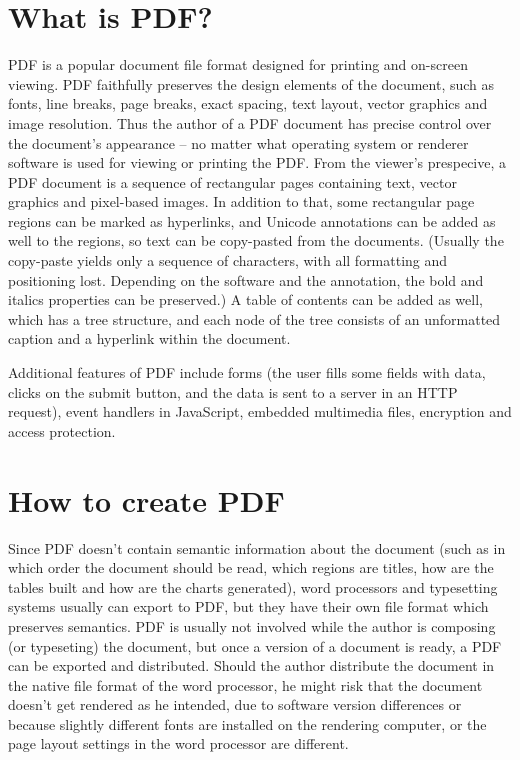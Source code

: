 \documentclass{article}
\begin{document}
\section{What is PDF?}

PDF is a popular document file format designed for printing and on-screen
viewing. PDF faithfully preserves the design elements of the document, such
as fonts, line breaks, page breaks, exact spacing, text layout, vector
graphics and image resolution. Thus the author of a PDF document has precise
control over the document's appearance -- no matter what operating system or
renderer software is used for viewing or printing the PDF. From the viewer's
prespecive, a PDF document is a sequence of rectangular pages containing
text, vector graphics and pixel-based images. In addition to that, some
rectangular page regions can be marked as hyperlinks, and Unicode
annotations can be added as well to the regions, so text can be copy-pasted
from the documents. (Usually the copy-paste yields only a sequence of
characters, with all formatting and positioning lost. Depending on the
software and the annotation, the bold and italics properties can be
preserved.) A table of contents can be added as well, which has a tree
structure, and each node of the tree consists of an unformatted caption and
a hyperlink within the document.

Additional features of PDF include forms (the user fills some fields with
data, clicks on the submit button, and the data is sent to a server in an
HTTP request), event handlers in JavaScript, embedded multimedia files,
encryption and access protection.

\section{How to create PDF}

Since PDF doesn't contain semantic information about the document (such as
in which order the document should be read, which regions are titles, how
are the tables built and how are the charts generated), word processors and
typesetting systems usually can export to PDF, but they have their own file
format which preserves semantics. PDF is usually not involved while the
author is composing (or typeseting) the document, but once a version of a
document is ready, a PDF can be exported and distributed. Should the author
distribute the document in the native file format of the word processor, he
might risk that the document doesn't get rendered as he intended, due to
software version differences or because slightly different fonts are
installed on the rendering computer, or the page layout settings in the word
processor are different.
\end{document}
